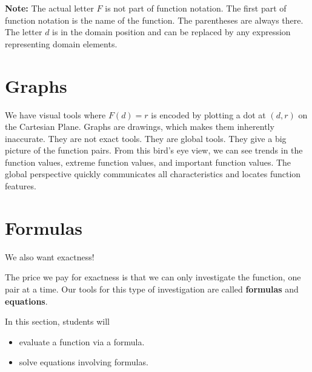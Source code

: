 \documentclass{ximera}
\begin{document}
\textbf{Note:}  The actual letter $F$ is not part of function notation.  The first part of function notation is the name of the function. The parentheses are always there.  The letter $d$ is in the domain position and can be replaced by any expression representing domain elements.










\section{Graphs}

We have visual tools where $F(d) = r$ is encoded by plotting a dot at $(d, r)$ on the Cartesian Plane.  Graphs are drawings, which makes them inherently inaccurate.  They are not exact tools.  They are global tools.  They give a big picture of the function pairs.  From this bird's eye view, we can see trends in the function values, extreme function values, and important function values. The global perspective quickly communicates all characteristics and locates function features.












\section{Formulas}
We also want exactness!

The price we pay for exactness is that we can only investigate the function, one pair at a time.  Our tools for this type of investigation are called \textbf{formulas} and \textbf{equations}.










\begin{sectionOutcomes}
In this section, students will 

\begin{itemize}
\item evaluate a function via a formula.
\item solve equations involving formulas.
\end{itemize}
\end{sectionOutcomes}
\end{document}
